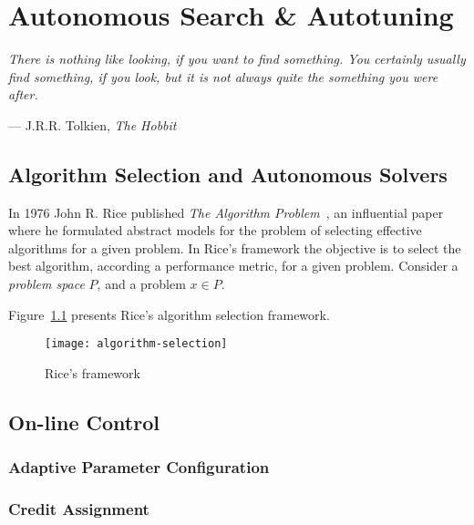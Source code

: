 \chapter{Autonomous Search \& Autotuning}
\label{chap:autonomous}
\epigraph{\textit{There is nothing like looking, if you want to find something. You
certainly usually find something, if you look, but it is not always quite the
something you were after.}}{--- J.R.R. Tolkien, \textit{The Hobbit}}


\section{Algorithm Selection and Autonomous Solvers}
\label{sec:algselres}

In 1976 John R. Rice published \textit{The Algorithm
Problem}~\cite{rice1976algorithm}, an influential paper where he formulated
abstract models for the problem of selecting effective algorithms for a given
problem. In Rice's framework the objective is to select the best algorithm,
according a performance metric, for a given problem. Consider a \textit{problem
space} $P$, and a problem $x \in P$.

Figure~\ref{fig:riceframe} presents Rice's algorithm selection
framework.

\begin{figure}[htpb]
    \begin{center}
        \texttt{[image: algorithm-selection]}
    \end{center}
    \caption{Rice's framework}
    \label{fig:riceframe}
\end{figure}


\section{On-line Control}
\label{sec:oncontrol}

\subsection{Adaptive Parameter Configuration}
\label{subsec:paramadaptive}

\subsection{Credit Assignment}
\label{subsec:creditassign}


